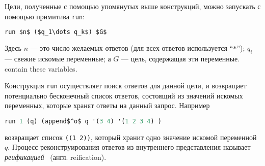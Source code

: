 Цели, полученные с помощью упомянутых выше конструкций, можно запускать с помощью примитива \lstinline|run|:

\begin{lstlisting}[mathescape=true,language=scheme]
   run $n$ ($q_1\dots q_k$) $G$
\end{lstlisting}

\noindent Здесь $n$ --- это число желаемых ответов (для всех ответов используется \enquote{\texttt{*}}); $q_i$ --- свежие искомые переменные; а $G$ --- цель, содержащая эти переменные.
contain these variables.


Конструкция \lstinline|run| осуществляет поиск ответов для данной цели, и возвращает потенциально бесконечный список ответов, состоящий из значений искомых переменных, которые хранят ответы на данный запрос. Например

\begin{lstlisting}[mathescape=true,language=scheme]
   run 1 (q) (append$^o$ q '(3 4) '(1 2 3 4) )
\end{lstlisting}

\noindent возвращает список \lstinline|((1 2))|, который хранит одно значение искомой переменной $q$.
Процесс реконструирования ответов из внутреннего представления называет \emph{реификацией}~\cite{WillThesis} (англ. reification).

